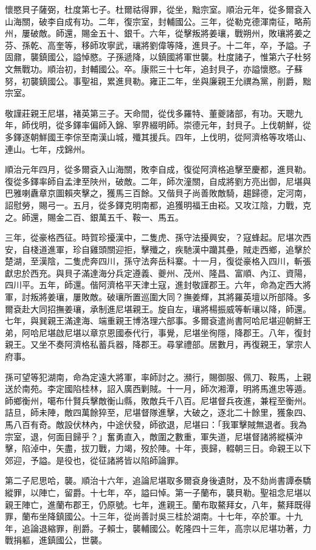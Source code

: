 \begin{pinyinscope}
懷愍貝子薩弼，杜度第七子。杜爾祜得罪，從坐，黜宗室。順治元年，從多爾袞入山海關，破李自成有功。二年，復宗室，封輔國公。三年，從勒克德渾南征，略荊州，屢破敵。師還，賜金五十、銀千。六年，從擊叛將姜瓖，戰朔州，敗瓖將姜之芬、孫乾、高奎等，移師攻寧武，瓖將劉偉等降，進貝子。十二年，卒，予謚。子固鼐，襲鎮國公，謚悼愍。子孫遞降，以鎮國將軍世襲。杜度諸子，惟第六子杜努文無戰功。順治初，封輔國公。卒。康熙三十七年，追封貝子，亦謚懷愍。子蘇努，初襲鎮國公。事聖祖，累進貝勒。雍正二年，坐與廉親王允禩為黨，削爵，黜宗室。

敬謹莊親王尼堪，褚英第三子。天命間，從伐多羅特、董夔諸部，有功。天聰九年，師伐明，從多鐸率偏師入錦、寧界綴明師。崇德元年，封貝子。上伐朝鮮，從多鐸逐朝鮮國王李倧至南漢山城，殲其援兵。四年，上伐明，從阿濟格等攻塔山、連山。七年，戍錦州。

順治元年四月，從多爾袞入山海關，敗李自成，復從阿濟格追擊至慶都，進貝勒。復從多鐸率師自孟津至陜州，破敵。二年，師次潼關，自成將劉方亮出御，尼堪與巴雅喇纛章京圖賴夾擊之，獲馬三百餘。又偕貝子尚善敗敵騎，趨歸德，定河南，詔慰勞，賜弓一。五月，從多鐸克明南都，追獲明福王由崧。又攻江陰，力戰，克之。師還，賜金二百、銀萬五千、鞍一、馬五。

三年，從豪格西征。時賀珍擾漢中，二隻虎、孫守法擾興安，？寇蜂起。尼堪次西安，自棧道進軍，珍自雞頭關迎拒，擊殲之，疾馳漢中躪其壘，賊走西鄉，追擊於楚湖，至漢陰，二隻虎奔四川，孫守法奔岳科寨。十一月，復從豪格入四川，斬張獻忠於西充。與貝子滿達海分兵定遵義、夔州、茂州、隆昌、富順、內江、資陽，四川平。五年，師還。偕阿濟格平天津土寇，進封敬謹郡王。六年，命為定西大將軍，討叛將姜瓖，屢敗敵。破瓖所置巡圍大同？撫姜輝，其將羅英壇以所部降。多爾袞赴大同招撫姜瓖，承制進尼堪親王。旋自左，瓖將楊振威等斬瓖以降，師還。七年，與巽親王滿達海、端重親王博洛理六部事。多爾袞遣尚書阿哈尼堪迎朝鮮王弟，阿哈尼堪啟尼堪以章京恩國泰代行，事覺，尼堪坐徇隱，降郡王。八年，復封親王。又坐不奏阿濟格私蓄兵器，降郡王。尋掌禮部。居數月，再復親王，掌宗人府事。

孫可望等犯湖南，命為定遠大將軍，率師討之。瀕行，賜御服、佩刀、鞍馬，上親送於南苑。李定國陷桂林，詔入廣西剿賊。十一月，師次湘潭，明將馬進忠等遁。師鄉衡州，噶布什賢兵擊敵衡山縣，敗敵兵千八百。尼堪督兵夜進，兼程至衡州。詰旦，師未陣，敵四萬餘猝至，尼堪督隊進擊，大破之，逐北二十餘里，獲象四、馬八百有奇。敵設伏林內，中途伏發，師欲退，尼堪曰：「我軍擊賊無退者。我為宗室，退，何面目歸乎？」奮勇直入，敵圍之數重，軍失道，尼堪督諸將縱橫沖擊，陷淖中，矢盡，拔刀戰，力竭，歿於陣。十年，喪歸，輟朝三日。命親王以下郊迎，予謚。是役也，從征諸將皆以陷師論罪。

第二子尼思哈，襲。順治十六年，追論尼堪取多爾袞身後遺財，及不劾尚書譚泰驕縱罪，以陣亡，留爵。十七年，卒，謚曰悼。第一子蘭布，襲貝勒。聖祖念尼堪以親王陣亡，進蘭布郡王，仍原號。七年，進親王。蘭布取鰲拜女，八年，鰲拜既得罪，蘭布坐降鎮國公。十三年，從尚善討吳三桂於湖南。十七年，卒於軍。十九年，追論退縮罪，削爵。子賴士，襲輔國公。乾隆四十三年，高宗以尼堪功著，力戰捐軀，進鎮國公，世襲。


\end{pinyinscope}
